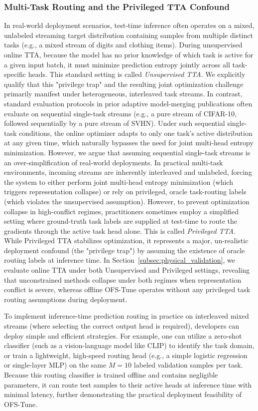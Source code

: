 \subsubsection{Multi-Task Routing and the Privileged TTA Confound}
In real-world deployment scenarios, test-time inference often operates on a mixed, unlabeled streaming target distribution containing samples from multiple distinct tasks (e.g., a mixed stream of digits and clothing items).
During unsupervised online TTA, because the model has no prior knowledge of which task is active for a given input batch, it must minimize prediction entropy jointly across all task-specific heads.
This standard setting is called \emph{Unsupervised TTA}.
We explicitly qualify that this "privilege trap" and the resulting joint optimization challenge primarily manifest under heterogeneous, interleaved task streams.
In contrast, standard evaluation protocols in prior adaptive model-merging publications often evaluate on sequential single-task streams (e.g., a pure stream of CIFAR-10, followed sequentially by a pure stream of SVHN).
Under such sequential single-task conditions, the online optimizer adapts to only one task's active distribution at any given time, which naturally bypasses the need for joint multi-head entropy minimization.
However, we argue that assuming sequential single-task streams is an over-simplification of real-world deployments.
In practical multi-task environments, incoming streams are inherently interleaved and unlabeled, forcing the system to either perform joint multi-head entropy minimization (which triggers representation collapse) or rely on privileged, oracle task-routing labels (which violates the unsupervised assumption).
However, to prevent optimization collapse in high-conflict regimes, practitioners sometimes employ a simplified setting where ground-truth task labels are supplied at test-time to route the gradients through the active task head alone.
This is called \emph{Privileged TTA}.
While Privileged TTA stabilizes optimization, it represents a major, un-realistic deployment confound (the "privilege trap") by assuming the existence of oracle routing labels at inference time.
In Section~\ref{subsec:physical_validation}, we evaluate online TTA under both Unsupervised and Privileged settings, revealing that unconstrained methods collapse under both regimes when representation conflict is severe, whereas offline OFS-Tune operates without any privileged task routing assumptions during deployment.

To implement inference-time prediction routing in practice on interleaved mixed streams (where selecting the correct output head is required), developers can deploy simple and efficient strategies.
For example, one can utilize a zero-shot classifier (such as a vision-language model like CLIP) to identify the task domain, or train a lightweight, high-speed routing head (e.g., a simple logistic regression or single-layer MLP) on the same $M=10$ labeled validation samples per task.
Because this routing classifier is trained offline and contains negligible parameters, it can route test samples to their active heads at inference time with minimal latency, further demonstrating the practical deployment feasibility of OFS-Tune.

